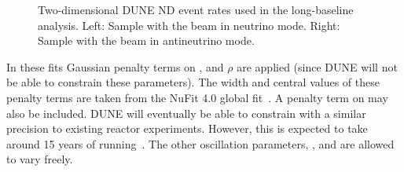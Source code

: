 \begin{figure}[h]
	\begin{minipage}[t]{.5\linewidth}
		\begin{adjustbox}{max totalsize=\linewidth, center}
			
		\end{adjustbox}
	\end{minipage}
	\hfill
	\begin{minipage}[t]{.5\linewidth}
		\begin{adjustbox}{max totalsize=\linewidth, center}
			
		\end{adjustbox}
	\end{minipage}
	\caption[Two-dimensional DUNE ND event rates used in the long-baseline analysis]{Two-dimensional DUNE ND event rates used in the long-baseline analysis. Left: Sample with the beam in neutrino mode. Right: Sample with the beam in antineutrino mode.}
	\label{fig:ndEventRates}
\end{figure}

In these fits Gaussian penalty terms on ,  and $\rho$ are applied (since DUNE will not be able to constrain these parameters).
The width and central values of these penalty terms are taken from the NuFit 4.0 global fit~\cite{nufit4}.
A penalty term on  may also be included.
DUNE will eventually be able to constrain  with a similar precision to existing reactor experiments. 
However, this is expected to take around 15 years of running~\cite{tdrVol2}.
The other oscillation parameters, ,  and \dcp are allowed to vary freely.

